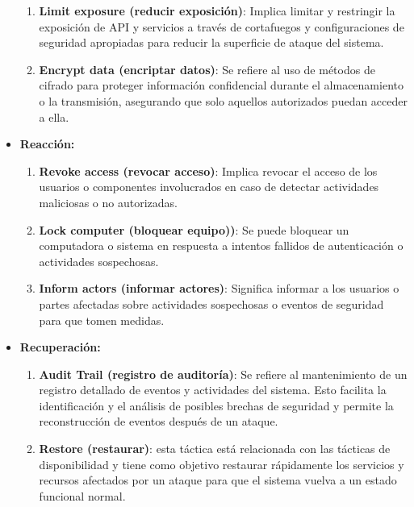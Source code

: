 \documentclass{article}
\begin{document}
\begin{itemize}
\begin{enumerate}
				\item \textbf{Limit exposure (reducir exposición)}: Implica limitar y restringir la exposición de API y servicios a través de cortafuegos y configuraciones de seguridad apropiadas para reducir la superficie de ataque del sistema.
				
				\item \textbf{Encrypt data (encriptar datos)}: Se refiere al uso de métodos de cifrado para proteger información confidencial durante el almacenamiento o la transmisión, asegurando que solo aquellos autorizados puedan acceder a ella.
				
								
			\end{enumerate}	
			
			\item \textbf{Reacción:}
			\begin{enumerate}
				\item \textbf{Revoke access (revocar acceso)}: Implica revocar el acceso de los usuarios o componentes involucrados en caso de detectar actividades maliciosas o no autorizadas.
				
				
				\item \textbf{Lock computer (bloquear equipo))}: Se puede bloquear un computadora o sistema en respuesta a intentos fallidos de autenticación o actividades sospechosas.
				
				
				\item \textbf{Inform actors (informar actores)}: Significa informar a los usuarios o partes afectadas sobre actividades sospechosas o eventos de seguridad para que tomen medidas.
				
			\end{enumerate}	
			
			\item \textbf{Recuperación:}
			\begin{enumerate}
				\item \textbf{Audit Trail (registro de auditoría)}: Se refiere al mantenimiento de un registro detallado de eventos y actividades del sistema. Esto facilita la identificación y el análisis de posibles brechas de seguridad y permite la reconstrucción de eventos después de un ataque.
				
				\item \textbf{Restore (restaurar)}: esta táctica está relacionada con las tácticas de disponibilidad y tiene como objetivo restaurar rápidamente los servicios y recursos afectados por un ataque para que el sistema vuelva a un estado funcional normal.
				
				
			\end{enumerate}	
			
		\end{itemize}
		
\end{document}
